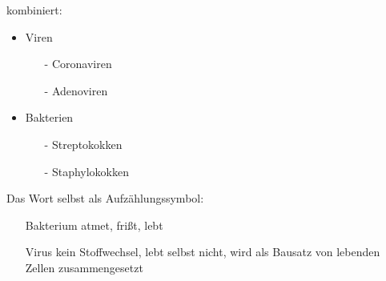 \documentclass[11pt,a4paper,twoside,titlepage]{book}
\begin{document}
kombiniert:
\begin{itemize}
\item Viren
\begin{itemize}
\item[-] Coronaviren
\item[-] Adenoviren
\end{itemize}
\item Bakterien
\begin{itemize}
\item[-] Streptokokken
\item[-] Staphylokokken
\end{itemize}
\end{itemize}

Das Wort selbst als Aufzählungssymbol:
\begin{itemize}
\item[Bakterium] atmet, frißt, lebt
\item[Virus] kein Stoffwechsel, lebt selbst nicht, wird als Bausatz von lebenden Zellen zusammengesetzt
\end{itemize}
\end{document}

